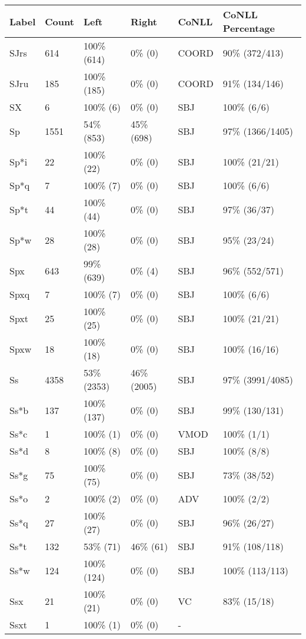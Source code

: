 \begin{figure*}
\begin{tabular}{|l|l|l|l||l|l|}
\hline
Label & Count & Left & Right & CoNLL & CoNLL Percentage\\ 
\hline
 SJrs & 614 & 100\% (614) & 0\% (0) & COORD & 90\% (372/413) \\ 
\hline
 SJru & 185 & 100\% (185) & 0\% (0) & COORD & 91\% (134/146) \\ 
\hline
 SX & 6 & 100\% (6) & 0\% (0) & SBJ & 100\% (6/6) \\ 
\hline
 Sp & 1551 & 54\% (853) & 45\% (698) & SBJ & 97\% (1366/1405) \\ 
\hline
 Sp*i & 22 & 100\% (22) & 0\% (0) & SBJ & 100\% (21/21) \\ 
\hline
 Sp*q & 7 & 100\% (7) & 0\% (0) & SBJ & 100\% (6/6) \\ 
\hline
 Sp*t & 44 & 100\% (44) & 0\% (0) & SBJ & 97\% (36/37) \\ 
\hline
 Sp*w & 28 & 100\% (28) & 0\% (0) & SBJ & 95\% (23/24) \\ 
\hline
 Spx & 643 & 99\% (639) & 0\% (4) & SBJ & 96\% (552/571) \\ 
\hline
 Spxq & 7 & 100\% (7) & 0\% (0) & SBJ & 100\% (6/6) \\ 
\hline
 Spxt & 25 & 100\% (25) & 0\% (0) & SBJ & 100\% (21/21) \\ 
\hline
 Spxw & 18 & 100\% (18) & 0\% (0) & SBJ & 100\% (16/16) \\ 
\hline
 Ss & 4358 & 53\% (2353) & 46\% (2005) & SBJ & 97\% (3991/4085) \\ 
\hline
 Ss*b & 137 & 100\% (137) & 0\% (0) & SBJ & 99\% (130/131) \\ 
\hline
 Ss*c & 1 & 100\% (1) & 0\% (0) & VMOD & 100\% (1/1) \\ 
\hline
 Ss*d & 8 & 100\% (8) & 0\% (0) & SBJ & 100\% (8/8) \\ 
\hline
 Ss*g & 75 & 100\% (75) & 0\% (0) & SBJ & 73\% (38/52) \\ 
\hline
 Ss*o & 2 & 100\% (2) & 0\% (0) & ADV & 100\% (2/2) \\ 
\hline
 Ss*q & 27 & 100\% (27) & 0\% (0) & SBJ & 96\% (26/27) \\ 
\hline
 Ss*t & 132 & 53\% (71) & 46\% (61) & SBJ & 91\% (108/118) \\ 
\hline
 Ss*w & 124 & 100\% (124) & 0\% (0) & SBJ & 100\% (113/113) \\ 
\hline
 Ssx & 21 & 100\% (21) & 0\% (0) & VC & 83\% (15/18) \\ 
\hline
 Ssxt & 1 & 100\% (1) & 0\% (0) & - &  \\ 

\end{tabular}
\end{figure*}
